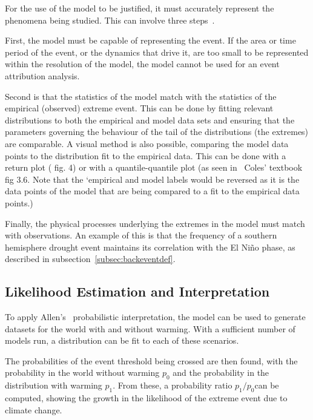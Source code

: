 For the use of the model to be justified,
    it must accurately represent the phenomena being studied.
This can involve three steps~\cite{van_Oldenborgh_et_al_2021}.

First, the model must be capable of representing the event.
If the area or time period of the event,
    or the dynamics that drive it, are too small to be represented within the resolution of the model,
    the model cannot be used for an event attribution analysis.

Second is that the statistics of the model match with the statistics of the empirical (observed) extreme event.
This can be done by fitting relevant distributions to both the empirical and model data sets and ensuring that the
    parameters governing the behaviour of the tail of the distributions (the extremes) are comparable.
A visual method is also possible, comparing the model data points to the distribution fit to the empirical data.
This can be done with a return plot (\cite{van_Oldenborgh_et_al_2021} fig. 4)
    or with a quantile-quantile plot (as seen in~ Coles' textbook\cite{Coles_2001} fig 3.6. Note that the `empirical and model labels
    would be reversed as it is the data points of the model that are being compared to a fit to the empirical data points.)

Finally,
    the physical processes underlying the extremes in the model must match with observations.
An example of this is that the frequency of a southern hemisphere drought event maintains its correlation with the El Niño phase,
    as described in subsection~\ref{subsec:backeventdef}.

\subsection{Likelihood Estimation and Interpretation}\label{subsec:backlikeest}

To apply Allen's~\cite{Allen_2003} probabilistic interpretation,
    the model can be used to generate datasets for the world with and without warming.
With a sufficient number of models run,
    a distribution can be fit to each of these scenarios.

The probabilities of the event threshold being crossed are then found,
    with the probability in the world without warming $p_0$ and the probability in the distribution with warming $p_1$.
From these, a probability ratio  $p_1 / p_0$can be computed,
    showing the growth in the likelihood of the extreme event due to climate change.

